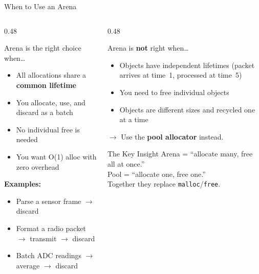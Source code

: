 \documentclass[aspectratio=169, 10pt]{beamer}
\begin{document}
\begin{frame}{When to Use an Arena}
\begin{columns}[T]
\begin{column}{0.48\textwidth}
\begin{block}{Arena is the right choice when\ldots}
\begin{itemize}
  \item All allocations share a \textbf{common lifetime}
  \item You allocate, use, and discard as a batch
  \item No individual free is needed
  \item You want O(1) alloc with zero overhead
\end{itemize}
\vspace{0.3em}
\textbf{Examples:}
\begin{itemize}
  \item Parse a sensor frame $\rightarrow$ discard
  \item Format a radio packet $\rightarrow$ transmit $\rightarrow$ discard
  \item Batch ADC readings $\rightarrow$ average $\rightarrow$ discard
\end{itemize}
\end{block}
\end{column}

\begin{column}{0.48\textwidth}
\begin{alertblock}{Arena is \textbf{not} right when\ldots}
\begin{itemize}
  \item Objects have independent lifetimes (packet arrives
        at time~1, processed at time~5)
  \item You need to free individual objects
  \item Objects are different sizes and recycled one at a time
\end{itemize}
\vspace{0.3em}
$\rightarrow$ Use the \textbf{pool allocator} instead.
\end{alertblock}

\vspace{0.5em}
\begin{block}{The Key Insight}
Arena = ``allocate many, free all at once.''\\
Pool = ``allocate one, free one.''\\
Together they replace \texttt{malloc}/\texttt{free}.
\end{block}
\end{column}
\end{columns}
\end{frame}
\end{document}

